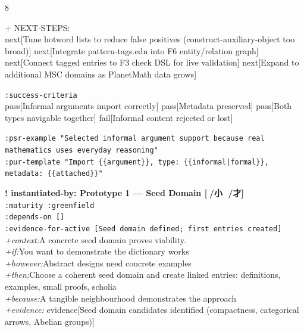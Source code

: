 \documentclass[landscape]{article}
\newcommand{\flexitag}[1]{\textcolor[gray]{0.35}{\textit{#1}}}
\newenvironment{devmapactive}{%
  \def\FrameCommand{\colorbox{devmapactivebg}}%
  \setlength{\fboxsep}{2pt}%
  \MakeFramed{\advance\hsize-\width \FrameRestore}%
}{\endMakeFramed}
\newenvironment{devmapgreenfield}{%
  \def\FrameCommand{\colorbox{devmapgreenfieldbg}}%
  \setlength{\fboxsep}{2pt}%
  \MakeFramed{\advance\hsize-\width \FrameRestore}%
}{\endMakeFramed}
\begin{document}
\begin{paracol}{8}
\begin{devmapactive}
\par
  + NEXT-STEPS:\\
    next[Tune hotword lists to reduce false positives (construct-auxiliary-object too broad)] next[Integrate pattern-tags.edn into F6 entity/relation graph] next[Connect tagged entries to F3 check DSL for live validation] next[Expand to additional MSC domains as PlanetMath data grows]\\
\par
  \texttt{:\allowbreak{}success-\allowbreak{}criteria}\\
    pass[Informal arguments import correctly] pass[Metadata preserved] pass[Both types navigable together] fail[Informal content rejected or lost]\\
\par
  \texttt{:\allowbreak{}psr-\allowbreak{}example "Selected informal argument support because real mathematics uses everyday reasoning"}\\
  \texttt{:\allowbreak{}pur-\allowbreak{}template "Import \{\{argument\}\},\allowbreak{} type:\allowbreak{} \{\{informal|\allowbreak{}formal\}\},\allowbreak{} metadata:\allowbreak{} \{\{attached\}\}"}\\
\par
\par
\end{devmapactive}
\begin{devmapgreenfield}
\textbf{! instantiated-by: Prototype 1 — Seed Domain [🔸/小 💬/才]}\\
  \texttt{:\allowbreak{}maturity :\allowbreak{}greenfield}\\
  \texttt{:\allowbreak{}depends-\allowbreak{}on []}\\
  \texttt{:\allowbreak{}evidence-\allowbreak{}for-\allowbreak{}active [Seed domain defined;\allowbreak{} first entries created]}\\
  \flexitag{+context:}A concrete seed domain proves viability.\\
  \flexitag{+if:}You want to demonstrate the dictionary works\\
  \flexitag{+however:}Abstract designs need concrete examples\\
  \flexitag{+then:}Choose a coherent seed domain and create linked entries: definitions, examples, small proofs, scholia\\
  \flexitag{+because:}A tangible neighbourhood demonstrates the approach\\
  \flexitag{+evidence:} evidence[Seed domain candidates identified (compactness, categorical arrows, Abelian groups)]\\

\end{devmapgreenfield}
\end{paracol}
\end{document}
